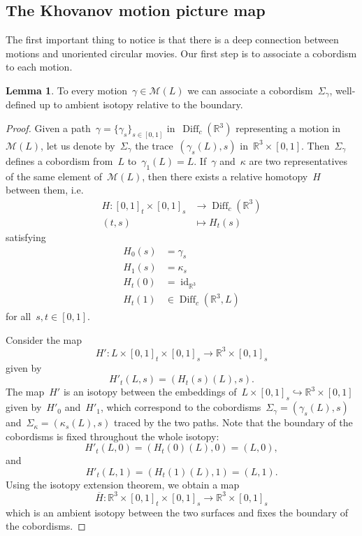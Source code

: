\documentclass{amsart}
\theoremstyle{definition}
\theoremstyle{definition}
\theoremstyle{definition}
\theoremstyle{definition}
\newtheorem{lemma}[theorem]{Lemma}
\DeclareMathOperator{\id}{id}
\newcommand{\R}{\mathbb{R}}
\newcommand{\calM}{\mathcal{M}}
\newcommand{\diff}{\operatorname{Diff}} %
\begin{document}
\subsection{The Khovanov motion picture map}\label{subsec:the Khovanov motion picture map}

The first important thing to notice is that there is a deep connection between motions and unoriented circular movies. Our first step is to associate a cobordism to each motion.

\begin{lemma}\label{lem:homotopic_ambient_isotopy}
    To every motion~$\gamma \in\calM(L)$ we can associate a cobordism~$\Sigma_\gamma$, well-defined up to ambient isotopy relative to the boundary.
\end{lemma}

\begin{proof}
    Given a path~$\gamma = \{\gamma_s\}_{s\in[0,1]}$ in~$\diff_c(\R^3)$ representing a motion in~$\calM(L)$, let us denote by~$\Sigma_\gamma$ the trace~$(\gamma_s(L),s)$ in~$\R^3 \times [0,1]$. Then~$\Sigma_\gamma$ defines a cobordism from~$L$ to~$\gamma_1(L)=L$.
    If~$\gamma$ and~$\kappa$ are two representatives of the same element of~$\calM(L)$, then there exists a relative homotopy~$H$  between them, i.e.~\begin{align*}
        H \colon [0,1]_t \times [0,1]_s & \to \diff_c (\mathbb{R}^3)\\
         (t,s)  & \mapsto H_t(s)
    \end{align*}
    satisfying
    \begin{align*}
        H_0(s)&=\gamma_s\\
        H_1(s)&=\kappa_s\\
        H_t(0)&=\id_{\mathbb{R}^3}\\
        H_t(1)&\in \diff_c(\mathbb{R}^3,L)
    \end{align*}
    for all~$s, t\in[0,1]$.
    
    Consider the map~$$H' \colon L \times  [0,1]_t\times [0,1]_s \to \mathbb{R}^3 \times [0,1]_s$$
    given by 
    ~$$ H'_t(L,s) = (H_t(s)(L),s).$$
    The map~$H'$ is an isotopy between the embeddings of~$L \times [0,1]_s \hookrightarrow \mathbb{R}^3 \times [0,1]$ given by~$H'_0$ and~$H'_1$, which correspond to the cobordisms~$\Sigma_\gamma=(\gamma_s(L),s)$ and~$\Sigma_{\kappa}=(\kappa_s(L),s)$ traced by the two paths.
    Note that the boundary of the cobordisms is fixed throughout the whole isotopy:~$$H'_t(L,0)= (H_t(0)(L),0)=(L,0),$$
    and~$$ H'_t(L,1)=(H_t(1)(L),1)=(L,1).$$
    Using the isotopy extension theorem, we obtain a map~$$ \overline{H} \colon \mathbb{R}^3 \times [0,1]_t\times [0,1]_s \to \mathbb{R}^3 \times [0,1]_s$$ which is an ambient isotopy between the two surfaces and fixes the boundary of the cobordisms.     
\end{proof}
\end{document}
